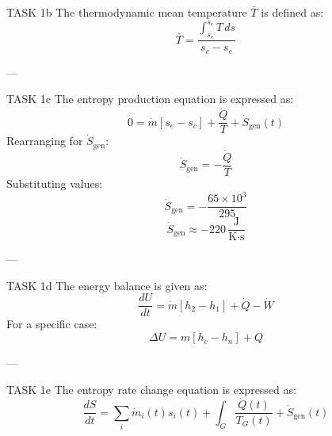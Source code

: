 TASK 1b  
The thermodynamic mean temperature \( \bar{T} \) is defined as:  
\[
\bar{T} = \frac{\int_{s_e}^{s_c} T \, ds}{s_c - s_e}
\]  

---

TASK 1c  
The entropy production equation is expressed as:  
\[
0 = \dot{m} \left[ s_e - s_c \right] + \frac{\dot{Q}}{T} + \dot{S}_{\text{gen}}(t)
\]  
Rearranging for \( \dot{S}_{\text{gen}} \):  
\[
\dot{S}_{\text{gen}} = -\frac{\dot{Q}}{T}
\]  
Substituting values:  
\[
\dot{S}_{\text{gen}} = -\frac{65 \times 10^3}{295}
\]  
\[
\dot{S}_{\text{gen}} \approx -220 \, \frac{\text{J}}{\text{K·s}}
\]  

---

TASK 1d  
The energy balance is given as:  
\[
\frac{dU}{dt} = \dot{m} \left[ h_2 - h_1 \right] + \dot{Q} - \dot{W}
\]  
For a specific case:  
\[
\Delta U = m \left[ h_c - h_n \right] + Q
\]  

---

TASK 1e  
The entropy rate change equation is expressed as:  
\[
\frac{dS}{dt} = \sum_i \dot{m}_i(t) s_i(t) + \int_{G} \frac{\dot{Q}(t)}{T_G(t)} + \dot{S}_{\text{gen}}(t)
\]  